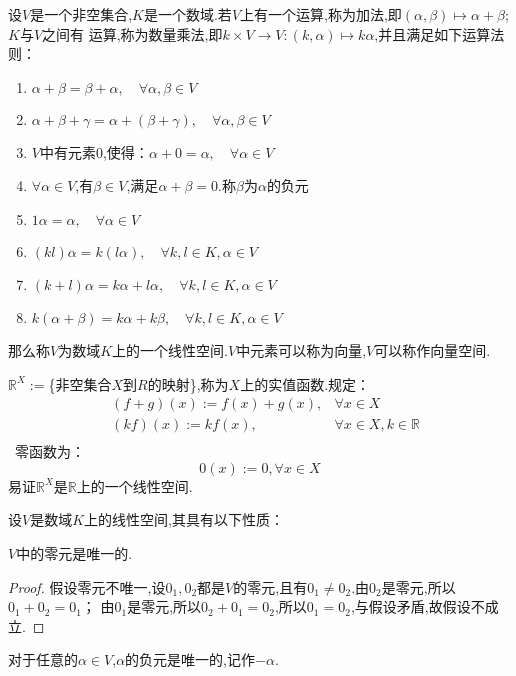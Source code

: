 \documentclass[blue,normal,cn]{elegantnote}
\begin{document}
\begin{definition}
设$V$是一个非空集合,$K$是一个数域.若$V$上有一个运算,称为加法,即$(α,β) \mapsto α + β$;$K$与$V$之间有
运算,称为数量乘法,即$k\times V \rightarrow V:(k,α) \mapsto kα$,并且满足如下运算法则：
    \begin{enumerate}[(1)]
        \item $α+β=β+α,\quad \forall α , β ∈ V $
        \item $α+β+γ=α+(β+γ),\quad \forall α,β ∈ V $
        \item $V$中有元素$0$,使得：$α + 0=α,\quad \forall α ∈ V$
        \item $\forall α ∈ V$,有$β ∈ V$,满足$α+β=0$.称$β$为$α$的负元
        \item $1α=α,\quad \forall α ∈ V$
        \item $(kl)α=k(lα),\quad \forall k,l ∈ K,α ∈ V$
        \item $(k+l)α=kα+lα,\quad \forall k,l ∈ K,α ∈ V$
        \item $k(α+β)=kα+kβ,\quad \forall k,l ∈ K,α ∈ V$
    \end{enumerate}
    那么称$V$为数域$K$上的一个线性空间.$V$中元素可以称为向量,$V$可以称作向量空间.
\end{definition}
\begin{example}
    $\mathbb{R}^X:=$\{非空集合$X$到$R$的映射\},称为$X$上的实值函数.规定：
    $$
        \begin{aligned}
        &(f+g)(x):=f(x)+g(x),&\forall x ∈ X\\
        &(kf)(x):=kf(x), &\forall x ∈ X,k∈ \mathbb{R}\\
        \end{aligned}
    $$\
    零函数为：
    $$
        0(x):=0,\forall x ∈ X
    $$
    易证$\mathbb{R}^X$是$\mathbb{R}$上的一个线性空间.
\end{example}

设$V$是数域$K$上的线性空间,其具有以下性质：

\begin{property}
    $V$中的零元是唯一的.
\end{property}

\begin{proof}
    假设零元不唯一,设$0_1,0_2$都是$V$的零元,且有$0_1 ≠ 0_2 $.由$0_2$是零元,所以$0_1+0_2=0_1$；
    由$0_1$是零元,所以$0_2+0_1=0_2$,所以$0_1=0_2$,与假设矛盾,故假设不成立.
\end{proof}

\begin{property}
    对于任意的$α ∈ V$,$α$的负元是唯一的,记作$-α$.
\end{property}
\end{document}

